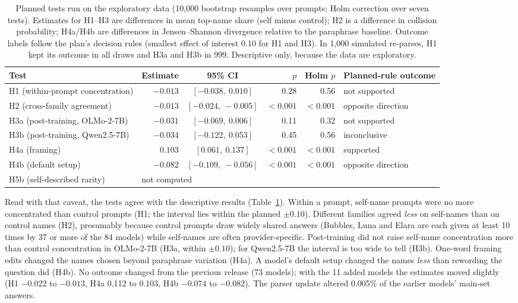 \documentclass[11pt]{article}
\begin{document}
\begin{table}[!htbp]
\centering
\small
\setlength{\tabcolsep}{4pt}
\begin{tabular}{@{}l r c r r l@{}}
\toprule
Test & Estimate & 95\% CI & $p$ & Holm $p$ & Planned-rule outcome \\
\midrule
H1 (within-prompt concentration) & $-0.013$ & $[-0.038,\ 0.010]$ & 0.28 & 0.56 & not supported \\
H2 (cross-family agreement) & $-0.013$ & $[-0.024,\ -0.005]$ & $<0.001$ & $<0.001$ & opposite direction \\
H3a (post-training, OLMo-2-7B) & $-0.031$ & $[-0.069,\ 0.006]$ & 0.11 & 0.32 & not supported \\
H3b (post-training, Qwen2.5-7B) & $-0.034$ & $[-0.122,\ 0.053]$ & 0.45 & 0.56 & inconclusive \\
H4a (framing) & $0.103$ & $[0.061,\ 0.137]$ & $<0.001$ & $<0.001$ & supported \\
H4b (default setup) & $-0.082$ & $[-0.109,\ -0.056]$ & $<0.001$ & $<0.001$ & opposite direction \\
H5b (self-described rarity) & \multicolumn{5}{l}{not computed} \\
\bottomrule
\end{tabular}
\caption{Planned tests run on the exploratory data (10{,}000 bootstrap resamples over prompts; Holm correction over
seven tests). Estimates for H1--H3 are differences in mean top-name share (self minus control); H2 is a difference in
collision probability; H4a/H4b are differences in Jensen--Shannon divergence relative to the paraphrase baseline.
Outcome labels follow the plan's decision rules (smallest effect of interest 0.10 for H1 and H3). In 1{,}000
simulated re-parses, H1 kept its outcome in all draws and H3a and H3b in 999. Descriptive only, because the data are
exploratory.}
\label{tab:tests}
\end{table}

Read with that caveat, the tests agree with the descriptive results (Table~\ref{tab:tests}). Within a prompt, self-name
prompts were no more concentrated than control prompts (H1; the interval lies within the planned $\pm0.10$). Different
families agreed \emph{less} on self-names than on control names (H2), presumably because control prompts draw widely
shared answers (Bubbles, Luna and Elara are each given at least 10 times by 37 or more of the 84 models) while
self-names are often provider-specific. Post-training did not raise self-name concentration more than control
concentration in OLMo-2-7B (H3a, within $\pm0.10$); for Qwen2.5-7B the interval is too wide to tell (H3b). One-word
framing edits changed the names chosen beyond paraphrase variation (H4a). A model's default setup changed the names
\emph{less} than rewording the question did (H4b). No outcome changed from the previous release (73 models); with the
11 added models the estimates moved slightly (H1 $-0.022$ to $-0.013$, H4a 0.112 to 0.103, H4b $-0.074$ to $-0.082$).
The parser update altered 0.005\% of the earlier models' main-set answers.
\end{document}
